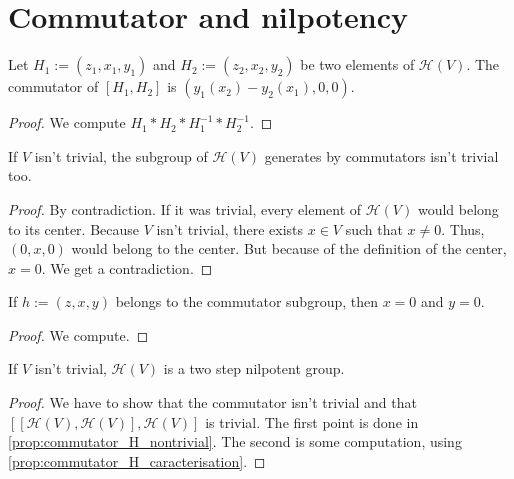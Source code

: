 \section{Commutator and nilpotency}

\begin{proposition}[Commutator]
    \label{prop:commutator_H_of_elements}
    \leanok 

    Let $H_1:=(z_1,x_1,y_1)$ and $H_2:=(z_2,x_2,y_2)$ be two elements of 
    $\mathcal{H}(V)$. The commutator of $[H_1,H_2]$ is $(y_1(x_2)-y_2(x_1),0,0)$.
    \begin{proof}
        \leanok
        We compute $H_1*H_2*H_1^{-1}*H_2^{-1}$.
    \end{proof}
\end{proposition}

\begin{proposition}
    \label{prop:commutator_H_nontrivial}
    \leanok 

    If $V$ isn't trivial, the subgroup of $\mathcal{H}(V)$ 
    generates by commutators isn't trivial too.
    \begin{proof}
        \leanok 
        By contradiction. If it was trivial, every element of $\mathcal{H}(V)$
        would belong to its center.
        Because $V$ isn't trivial, there exists $x\in V$ such that $x\ne0$. Thus,
        $(0,x,0)$ would belong to the center. But because of the definition of the center, $x = 0$. 
        We get a contradiction.
    \end{proof}
\end{proposition}

\begin{proposition}
        \label{prop:commutator_H_caracterisation}
        \leanok
    
        If $h:=(z,x,y)$ belongs to the commutator subgroup, then $x=0$ and $y=0$.
    \begin{proof}
        \leanok
        We compute.
    \end{proof}
\end{proposition}

\begin{theorem}
    \label{thm:two_step_nil}
    \leanok

    If $V$ isn't trivial, $\mathcal{H}(V)$ is a two step nilpotent group.
    \begin{proof}
        \leanok
        We have to show that the commutator isn't trivial and that $[[\mathcal{H}(V),\mathcal{H}(V)],\mathcal{H}(V)]$
        is trivial. The first point is done in \ref{prop:commutator_H_nontrivial}.
        The second is some computation, using \ref{prop:commutator_H_caracterisation}.
    \end{proof}
\end{theorem}

